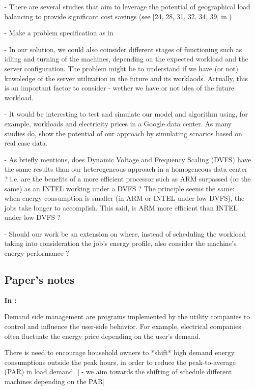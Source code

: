 - There are several studies that aim to leverage the potential of geographical 
  load balancing to provide significant cost savings (see [24, 28, 31, 32, 34,
  39] in \cite{GREENING})

- Make a problem specification as in \cite{CUTTING_BILL}

- In our solution, we could also coinsider different stages of functioning such
  as idling and turning of the machines, depending on the expected workload and
  the server configuration. The problem might be to understand if we have (or
  not) knwoledge of the server utilization in the future and its worklaods.
  Actually, this is an important factor to consider - wether we have or not idea
  of the future workload.  

- It would be interesting to test and simulate our model and algorithm using,
  for example, workloads and electricity prices in a Google data center. As many
  studies do, show the potential of our approach by simulating scnarios based on
  real case data. 

- As \cite{DYN_PRICING_HPC} briefly mentions, does  Dynamic Voltage and Frequency 
  Scaling (DVFS) have the same results than our heterogeneous approach in a
  homogeneous data center ? i.e. are the benefits of a more efficient processor
  such as ARM surpassed (or the same) as an INTEL working under a DVFS ? The
  principle seems the same: when energy consumption is smaller (in ARM or INTEL
  under low DVFS), the jobs take longer to accomplish. This said, is ARM more
  efficient than INTEL under low DVFS ?   

- Should our work be an extension on \cite{DYN_PRICING_HPC} where, instead of
  scheduling the workload taking into consideration the job's energy profile,
  also consider the machine's energy performance ?



\subsection{Paper's notes}
\textbf{In \cite{FUTURE_SMART_GRID}:}

Demand side management are programs implemented by the utility companies to
control and influence the user-side behavior. For example, electrical companies
often fluctuate the energy price depending on the user's demand.

There is need to encourage household owners to *shift* high demand energy
consumptions outside the peak hours, in order to reduce the peak-to-average
(PAR) in load demand.
[ - we aim towards the shifting of schedule different machines  depending on the PAR] 

